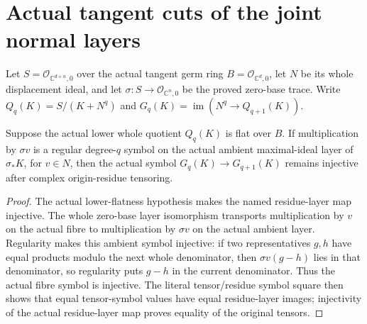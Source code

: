 \section{Actual tangent cuts of the joint normal layers}

Let $S=\mathcal O_{\mathbb C^{d+n},0}$ over the actual tangent germ
ring $B=\mathcal O_{\mathbb C^d,0}$, let $N$ be its whole displacement
ideal, and let $\sigma:S\to\mathcal O_{\mathbb C^n,0}$ be the proved
zero-base trace. Write $Q_q(K)=S/(K+N^q)$ and
$G_q(K)=\operatorname{im}(N^q\to Q_{q+1}(K))$.

\begin{theorem}
\label{hir:actual-joint-cut-complex-symbol}
\leanok
{}
Suppose the actual lower whole quotient $Q_q(K)$ is flat over $B$.
If multiplication by $\sigma v$ is a regular degree-$q$ symbol on the
actual ambient maximal-ideal layer of $\sigma_*K$, for $v\in N$, then
the actual symbol $G_q(K)\to G_{q+1}(K)$ remains injective after
complex origin-residue tensoring.
\end{theorem}
\begin{proof}
The actual lower-flatness hypothesis makes the named residue-layer map
injective. The whole zero-base layer isomorphism transports multiplication
by $v$ on the actual fibre to multiplication by $\sigma v$ on the
actual ambient layer. Regularity makes this ambient symbol injective:
if two representatives $g,h$ have equal products modulo the next whole
denominator, then $\sigma v(g-h)$ lies in that denominator, so
regularity puts $g-h$ in the current denominator. Thus the actual fibre
symbol is injective. The literal tensor/residue symbol square then
shows that equal tensor-symbol values have equal residue-layer images;
injectivity of the actual residue-layer map proves equality of the
original tensors.
\end{proof}

